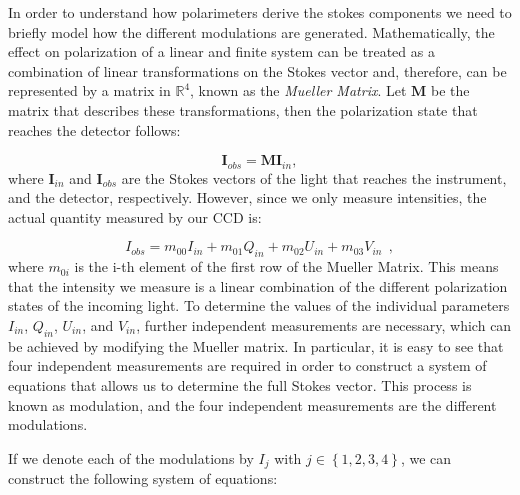 In order to understand how polarimeters derive the stokes components we need to briefly model how the different modulations are generated. Mathematically, the effect on polarization of a linear and finite system can be treated as a combination of linear transformations on the Stokes vector and, therefore, can be represented by a matrix in $\mathbb{R}^4$, known as the \textit{Mueller Matrix}. Let $\textbf{M}$ be the matrix that describes these transformations, then the polarization state that reaches the detector follows:

\begin{equation}
  \textbf{I}_{obs} = \textbf{M}\textbf{I}_{in},
  \label{eq_intro:modultaion_eqs}
\end{equation}
where $\textbf{I}_{in}$ and $\textbf{I}_{obs}$ are the Stokes vectors of the light that reaches the instrument, and the detector, respectively. However, since we only measure intensities, the actual quantity measured by our CCD is: 

\begin{equation}
  I_{obs} = m_{00}I_{in} + m_{01}Q_{in} + m_{02}U_{in} + m_{03}V_{in} \ \ ,
\end{equation}
where $m_{0i}$ is the i-th element of the first row of the Mueller Matrix. This means that the intensity we measure is a linear combination of the different polarization states of the incoming light. To determine the values of the individual parameters $I_{in}$, $Q_{in}$, $U_{in}$, and $V_{in}$, further independent measurements are necessary, which can be achieved by modifying the Mueller matrix. In particular, it is easy to see that four independent measurements are required in order to construct a system of equations that allows us to determine the full Stokes vector. This process is known as modulation, and the four independent measurements are the different modulations.

If we denote each of the modulations by $I _ j$ with $j \in \left\{ 1, 2, 3, 4\right\}$, we can construct the following system of equations:

